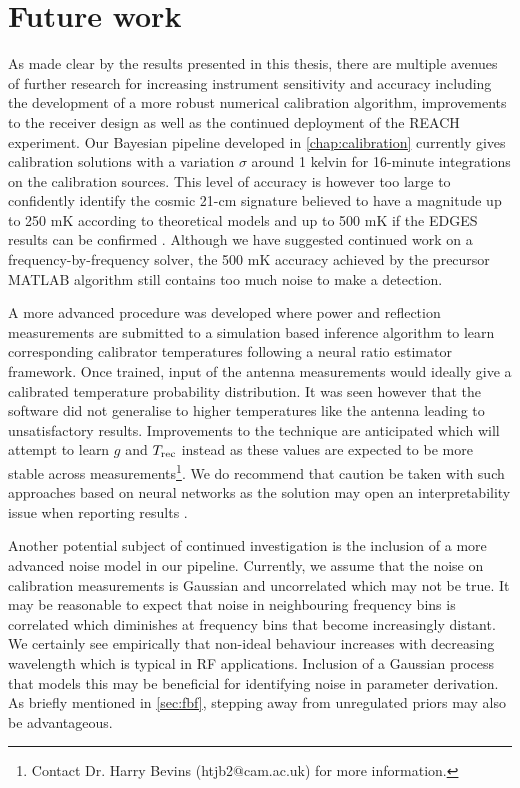 \section{Future work}\label{sec:future}
As made clear by the results presented in this thesis, there are multiple avenues of further research for increasing instrument sensitivity and accuracy including the development of a more robust numerical calibration algorithm, improvements to the receiver design as well as the continued deployment of the REACH experiment. Our Bayesian pipeline developed in \cref{chap:calibration} currently gives calibration solutions with a variation $\sigma$ around 1 kelvin for 16-minute integrations on the calibration sources. This level of accuracy is however too large to confidently identify the cosmic 21-cm signature believed to have a magnitude up to 250 mK according to theoretical models and up to 500 mK if the EDGES results can be confirmed \citep{theory_models,edgesNature}. Although we have suggested continued work on a frequency-by-frequency solver, the 500 mK accuracy achieved by the precursor MATLAB algorithm still contains too much noise to make a detection.

A more advanced procedure was developed where power and reflection measurements are submitted to a simulation based inference algorithm to learn corresponding calibrator temperatures following a neural ratio estimator framework. Once trained, input of the antenna measurements would ideally give a calibrated temperature probability distribution. It was seen however that the software did not generalise to higher temperatures like the antenna leading to unsatisfactory results. Improvements to the technique are anticipated which will attempt to learn $g$ and $T_{\mathrm{rec}}$ instead as these values are expected to be more stable across measurements\footnote{Contact Dr. Harry Bevins (htjb2@cam.ac.uk) for more information.}. We do recommend that caution be taken with such approaches based on neural networks as the solution may open an interpretability issue when reporting results \citep{bb_interpret}.

Another potential subject of continued investigation is the inclusion of a more advanced noise model in our pipeline. Currently, we assume that the noise on calibration measurements is Gaussian and uncorrelated which may not be true. It may be reasonable to expect that noise in neighbouring frequency bins is correlated which diminishes at frequency bins that become increasingly distant. We certainly see empirically that non-ideal behaviour increases with decreasing wavelength which is typical in RF applications. Inclusion of a Gaussian process that models this may be beneficial for identifying noise in parameter derivation. As briefly mentioned in \cref{sec:fbf}, stepping away from unregulated priors may also be advantageous.

